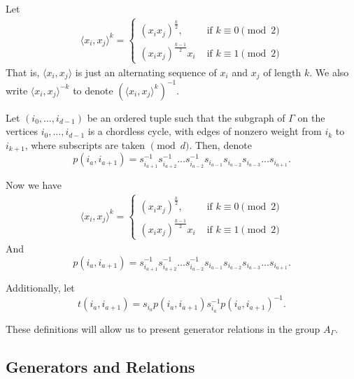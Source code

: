 \documentclass{beamer}
\begin{document}
\begin{frame}
\begin{block}

Let
\begin{align*}
\langle x_i,x_j \rangle ^k = \begin{cases}
(x_ix_j)^{\frac{k}{2}}, &\text{ if }k \equiv 0 \pmod 2\\
(x_ix_j)^{\frac{k-1}{2}}x_i &\text{ if } k \equiv 1 \pmod 2
\end{cases}
\end{align*}
That is, $\langle x_i,x_j \rangle$ is just an alternating sequence of $x_i$ and $x_j$ of length $k$.  We also write $\langle x_i,x_j\rangle^{-k}$ to denote $\left(\langle x_i,x_j\rangle^k\right)^{-1}$.
\end{block}

\begin{block}

Let $(i_0,\ldots, i_{d-1})$ be an ordered tuple such that the subgraph of $\Gamma$ on the vertices $i_0,\ldots, i_{d-1}$ is a chordless cycle, with edges of nonzero weight from $i_k$ to $i_{k+1}$, where subscripts are taken $\pmod d.$ Then, denote $$p(i_a,i_{a+1}) = s_{i_{a+1}}^{-1}s_{i_{a+2}}^{-1}\dots s_{i_{a-2}}^{-1}s_{i_{a-1}}s_{i_{a-2}}s_{i_{a-3}}\dots s_{i_{a+1}}.$$
\end{block}

\end{frame}
\begin{frame}
Now we have 
\begin{align*}
\langle x_i,x_j \rangle ^k = \begin{cases}
(x_ix_j)^{\frac{k}{2}}, &\text{ if }k \equiv 0 \pmod 2\\
(x_ix_j)^{\frac{k-1}{2}}x_i &\text{ if } k \equiv 1 \pmod 2
\end{cases}
\end{align*}
And $$p(i_a,i_{a+1}) = s_{i_{a+1}}^{-1}s_{i_{a+2}}^{-1}\dots s_{i_{a-2}}^{-1}s_{i_{a-1}}s_{i_{a-2}}s_{i_{a-3}}\dots s_{i_{a+1}}.$$

Additionally, let $$t(i_a,i_{a+1}) = s_{i_a} p(i_a,i_{a+1})  s_{i_a}^{-1}p(i_a,i_{a+1})^{-1}.$$

These definitions will allow us to present generator relations in the group $A_{\Gamma}$.

\end{frame}


\subsection{Generators and Relations}
\end{document}
